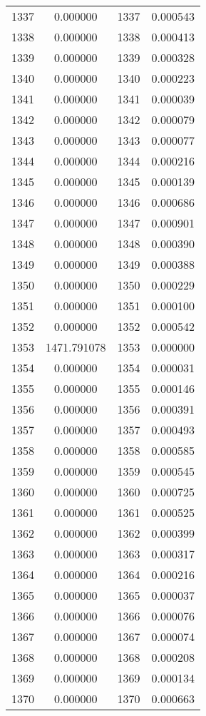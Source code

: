 \documentclass[12pt]{article}
\begin{document}
\begin{longtable}{@{}cccc@{}}
1337 & 0.000000 & 1337 & 0.000543 \\
1338 & 0.000000 & 1338 & 0.000413 \\
1339 & 0.000000 & 1339 & 0.000328 \\
1340 & 0.000000 & 1340 & 0.000223 \\
1341 & 0.000000 & 1341 & 0.000039 \\
1342 & 0.000000 & 1342 & 0.000079 \\
1343 & 0.000000 & 1343 & 0.000077 \\
1344 & 0.000000 & 1344 & 0.000216 \\
1345 & 0.000000 & 1345 & 0.000139 \\
1346 & 0.000000 & 1346 & 0.000686 \\
1347 & 0.000000 & 1347 & 0.000901 \\
1348 & 0.000000 & 1348 & 0.000390 \\
1349 & 0.000000 & 1349 & 0.000388 \\
1350 & 0.000000 & 1350 & 0.000229 \\
1351 & 0.000000 & 1351 & 0.000100 \\
1352 & 0.000000 & 1352 & 0.000542 \\
1353 & 1471.791078 & 1353 & 0.000000 \\
1354 & 0.000000 & 1354 & 0.000031 \\
1355 & 0.000000 & 1355 & 0.000146 \\
1356 & 0.000000 & 1356 & 0.000391 \\
1357 & 0.000000 & 1357 & 0.000493 \\
1358 & 0.000000 & 1358 & 0.000585 \\
1359 & 0.000000 & 1359 & 0.000545 \\
1360 & 0.000000 & 1360 & 0.000725 \\
1361 & 0.000000 & 1361 & 0.000525 \\
1362 & 0.000000 & 1362 & 0.000399 \\
1363 & 0.000000 & 1363 & 0.000317 \\
1364 & 0.000000 & 1364 & 0.000216 \\
1365 & 0.000000 & 1365 & 0.000037 \\
1366 & 0.000000 & 1366 & 0.000076 \\
1367 & 0.000000 & 1367 & 0.000074 \\
1368 & 0.000000 & 1368 & 0.000208 \\
1369 & 0.000000 & 1369 & 0.000134 \\
1370 & 0.000000 & 1370 & 0.000663 \\

\end{longtable}
\end{document}
